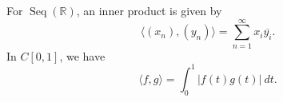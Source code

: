 \documentclass[a4paper, openany]{memoir}
\theoremstyle{definition}
\theoremstyle{plain}
\begin{document}

            
            

    For $\operatorname{Seq}(\mathbb{R})$, an inner product is given by
    \[\langle (x_n), (y_n) \rangle = \sum_{n=1}^\infty x_i \overline{y_i}.\]
    In $C[0, 1]$, we have
    \[\langle f, g \rangle = \int_0^1 |f(t) g(t)| \ dt.\]
    



\end{document}
